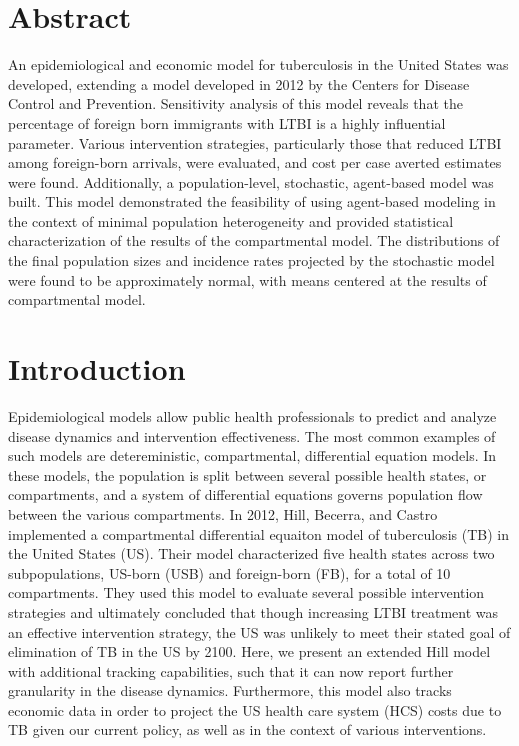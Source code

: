 \documentclass{amsart}
\begin{document}
\section{Abstract}
An epidemiological and economic model for tuberculosis in the United States
 was developed, extending a model developed in 2012 by the Centers
for Disease Control and Prevention. Sensitivity analysis of this model reveals
that the percentage of foreign born immigrants with LTBI is a highly influential
parameter. Various intervention strategies, particularly those that reduced LTBI
among foreign-born arrivals, were evaluated, and cost per case averted estimates
were found.  Additionally, a population-level, stochastic, agent-based model was
built. This model demonstrated the feasibility of using agent-based modeling in
the context of minimal population heterogeneity and provided statistical
characterization of the results of the compartmental model. The distributions
of the final population sizes and incidence rates projected by the stochastic model
were found to be approximately normal, with means centered at the results of
compartmental model.  

\section{Introduction}
Epidemiological models allow public health professionals to predict and analyze
disease dynamics and intervention effectiveness. The most common examples of
such models are detereministic, compartmental, differential equation models. In
these models, the population is split between several possible health states, or
compartments, and a system of differential equations governs population flow
between the various compartments. In 2012, Hill, Becerra, and Castro implemented
a compartmental differential equaiton model of tuberculosis (TB) in the United
States (US).  Their model characterized five health states across two
subpopulations, US-born (USB) and foreign-born (FB), for a total of 10
compartments. They used this model to evaluate several possible intervention
strategies and ultimately concluded that though increasing LTBI treatment was an
effective intervention strategy, the US was unlikely to meet their stated goal
of elimination of TB in the US by 2100. Here, we present an extended Hill model
with additional tracking capabilities, such that it can now report
further granularity in the disease dynamics. Furthermore, this model also tracks
economic data in order to project the US health care system (HCS) costs due to
TB given our current policy, as well as in the context of various interventions. 
\end{document}
